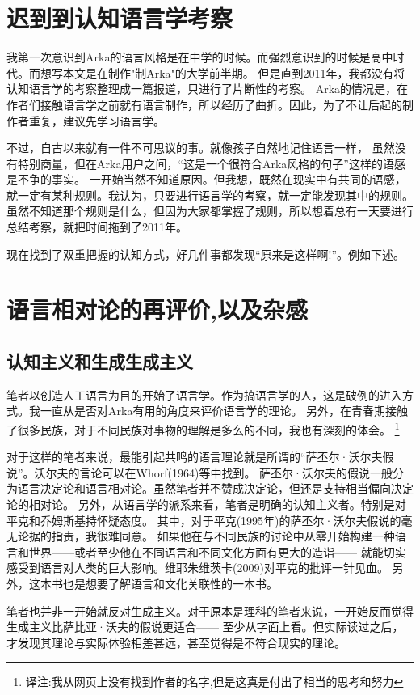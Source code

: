 \section{迟到到认知语言学考察}
我第一次意识到Arka的语言风格是在中学的时候。而强烈意识到的时候是高中时代。而想写本文是在制作"制Arka"的大学前半期。
但是直到2011年，我都没有将认知语言学的考察整理成一篇报道，只进行了片断性的考察。
Arka的情况是，在作者们接触语言学之前就有语言制作，所以经历了曲折。因此，为了不让后起的制作者重复，建议先学习语言学。

不过，自古以来就有一件不可思议的事。就像孩子自然地记住语言一样，
虽然没有特别商量，但在Arka用户之间，“这是一个很符合Arka风格的句子”这样的语感是不争的事实。
一开始当然不知道原因。但我想，既然在现实中有共同的语感，就一定有某种规则。我认为，只要进行语言学的考察，就一定能发现其中的规则。
虽然不知道那个规则是什么，但因为大家都掌握了规则，所以想着总有一天要进行总结考察，就把时间拖到了2011年。

现在找到了双重把握的认知方式，好几件事都发现“原来是这样啊!”。例如下述。
\section{语言相对论的再评价,以及杂感}
\subsection{认知主义和生成生成主义}
笔者以创造人工语言为目的开始了语言学。作为搞语言学的人，这是破例的进入方式。我一直从是否对Arka有用的角度来评价语言学的理论。
另外，在青春期接触了很多民族，对于不同民族对事物的理解是多么的不同，我也有深刻的体会。
\footnote{译注:我从网页上没有找到作者的名字,但是这真是付出了相当的思考和努力}

对于这样的笔者来说，最能引起共鸣的语言理论就是所谓的“萨丕尔·沃尔夫假说”。沃尔夫的言论可以在Whorf(1964)等中找到。
萨丕尔·沃尔夫的假说一般分为语言决定论和语言相对论。虽然笔者并不赞成决定论，但还是支持相当偏向决定论的相对论。
另外，从语言学的派系来看，笔者是明确的认知主义者。特别是对平克和乔姆斯基持怀疑态度。
其中，对于平克(1995年)的萨丕尔·沃尔夫假说的毫无论据的指责，我很难同意。
如果他在与不同民族的讨论中从零开始构建一种语言和世界------或者至少他在不同语言和不同文化方面有更大的造诣------
就能切实感受到语言对人类的巨大影响。维耶朱维茨卡(2009)对平克的批评一针见血。
另外，这本书也是想要了解语言和文化关联性的一本书。

笔者也并非一开始就反对生成主义。对于原本是理科的笔者来说，一开始反而觉得生成主义比萨比亚·沃夫的假说更适合——
至少从字面上看。但实际读过之后，才发现其理论与实际体验相差甚远，甚至觉得是不符合现实的理论。

